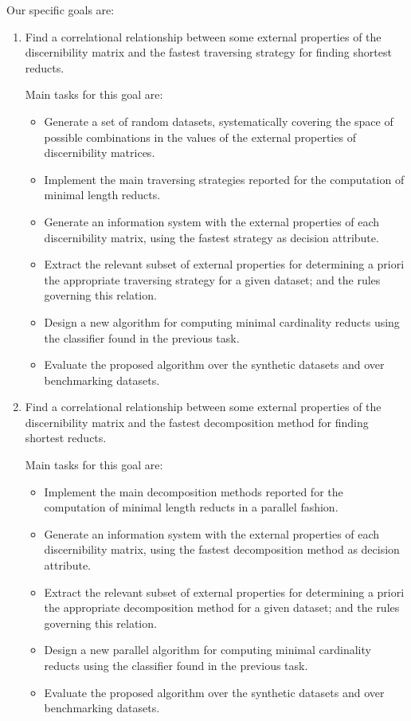 \documentclass[11pt]{article}   %
\begin{document}
  Our specific goals are:
  \begin{enumerate}
  \item Find a correlational relationship between some external properties of the discernibility matrix and the fastest 
  		traversing strategy for finding shortest reducts.
  		
  		Main tasks for this goal are:
  		\begin{itemize}
  		\item Generate a set of random datasets, systematically covering the space of possible combinations in 
  			  the values of the external properties of discernibility matrices.
  		\item Implement the main traversing strategies reported for the computation of minimal length reducts.
  		\item Generate an information system with the external properties of each discernibility matrix, using 
  			  the fastest strategy as decision attribute.
  		\item Extract the relevant subset of external properties for determining a priori the appropriate 
  			  traversing strategy for a given dataset; and the rules governing this relation.
  		\item Design a new algorithm for computing minimal cardinality reducts using the classifier found in
  			  the previous task.
  		\item Evaluate the proposed algorithm over the synthetic datasets and over benchmarking datasets.
  		\end{itemize}
  	
  \item Find a correlational relationship between some external properties of the discernibility matrix and the fastest 
  		decomposition method for finding shortest reducts.
  		
  		Main tasks for this goal are:
  		\begin{itemize}
  		\item Implement the main decomposition methods reported for the computation of minimal length reducts
  			  in a parallel fashion.
  		\item Generate an information system with the external properties of each discernibility matrix, using 
  			  the fastest decomposition method as decision attribute.
  		\item Extract the relevant subset of external properties for determining a priori the appropriate 
  			  decomposition method for a given dataset; and the rules governing this relation.
  		\item Design a new parallel algorithm for computing minimal cardinality reducts using the classifier 
  			  found in the previous task.
  		\item Evaluate the proposed algorithm over the synthetic datasets and over benchmarking datasets.
  		\end{itemize}
  

\end{enumerate}
\end{document}
